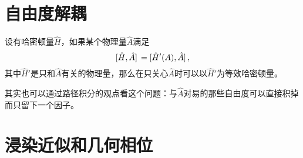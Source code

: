 \documentclass[UTF8, a4paper]{ctexart}
\begin{document}
\section{自由度解耦}

设有哈密顿量$\hat{H}$，如果某个物理量$\hat{A}$满足
\[
    \comm*{\hat{H}}{\hat{A}} = \comm*{\hat{H}'(A)}{\hat{A}},
\]
其中$\hat{H}'$是只和$\hat{A}$有关的物理量，那么在只关心$\hat{A}$时可以以$\hat{H}'$为等效哈密顿量。

其实也可以通过路径积分的观点看这个问题：与$\hat{A}$对易的那些自由度可以直接积掉而只留下一个因子。


\section{浸染近似和几何相位}
\end{document}
